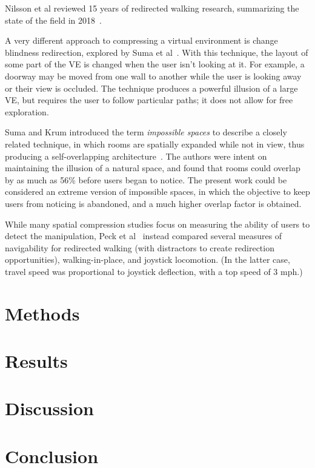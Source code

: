 \documentclass{sigchi}
\begin{document}
Nilsson et al reviewed 15 years of redirected walking research, summarizing the state of the field in 2018~\cite{nilsson201815}.

A very different approach to compressing a virtual environment is change blindness redirection, explored by Suma et al~\cite{suma2011leveraging}.  With this technique, the layout of some part of the VE is changed when the user isn't looking at it.  For example, a doorway may be moved from one wall to another while the user is looking away or their view is occluded.  The technique produces a powerful illusion of a large VE, but requires the user to follow particular paths; it does not allow for free exploration.

Suma and Krum introduced the term \textit{impossible spaces} to describe a closely related technique, in which rooms are spatially expanded while not in view, thus producing a self-overlapping architecture~\cite{suma2012impossible}.  The authors were intent on maintaining the illusion of a natural space, and found that rooms could overlap by as much as 56\% before users began to notice.  The present work could be considered an extreme version of impossible spaces, in which the objective to keep users from noticing is abandoned, and a much higher overlap factor is obtained.

While many spatial compression studies focus on measuring the ability of users to detect the manipulation, Peck et al~\cite{peck2011evaluation} instead compared several measures of navigability for redirected walking (with distractors to create redirection opportunities), walking-in-place, and joystick locomotion.  (In the latter case, travel speed was proportional to joystick deflection, with a top speed of 3 mph.)


\section{Methods}


\section{Results}

\section{Discussion}

\section{Conclusion}
\end{document}
